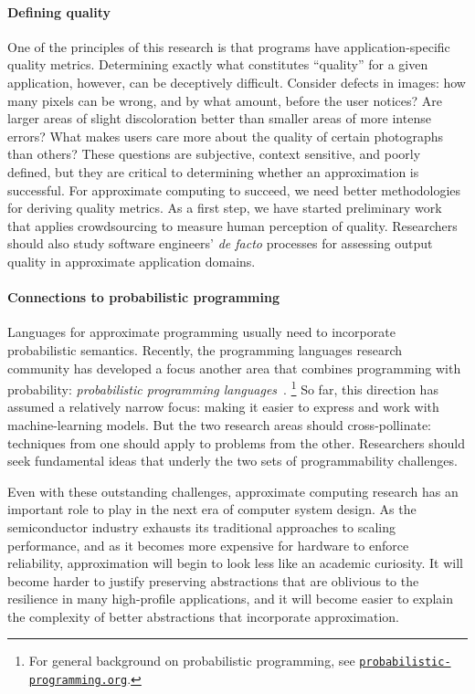 \paragraph{Defining quality}
One of the principles of this research is that programs have
application-specific quality metrics.
Determining exactly what constitutes ``quality'' for a given application,
however, can be deceptively difficult.
Consider defects in images:
how many pixels can be wrong, and by what amount, before the user notices?
Are larger areas of slight discoloration better than smaller areas of more
intense errors?
What makes users care more about the quality of certain photographs than
others?
These questions are subjective, context sensitive, and poorly defined, but
they are critical to determining whether an approximation is successful.
For approximate computing to succeed, we need better methodologies for
deriving quality metrics.
As a first step, we have started preliminary work that applies
crowdsourcing to measure human perception of quality.
Researchers should also study software engineers' \emph{de facto} processes for
assessing output quality in approximate application domains.

\paragraph{Connections to probabilistic programming}
Languages for app\-roximate program\-ming usually need to incorporate probabilistic
semantics.
Recently, the programming languages research community has developed a focus
another area that combines programming with probability:
\emph{probabilistic programming languages}~\cite{BBGR13, wingate-lightweight,
  church, chaganty, pfeffersample, probdsl, koller}.%
\footnote{%
    For general background on probabilistic programming, see
    \href{http://probabilistic-programming.org/}{\texttt{probabilistic-programming.org}}.%
}
So far, this direction has assumed a relatively narrow focus:
making it easier to express and work with machine-learning models.
But the two research areas should cross-pollinate:
techniques from one should apply to problems from the other.
Researchers should seek fundamental ideas that underly the two sets of
programmability challenges.

\vspace{\baselineskip}
\noindent
Even with these outstanding challenges, approximate computing research
has an important role to play in the next era of computer system design.
As the semiconductor industry exhausts its traditional approaches to scaling
performance, and as it becomes more expensive for hardware to enforce
reliability,
approximation will begin to look less like an academic curiosity.
It will become harder to justify preserving abstractions that are oblivious to
the resilience in many high-profile applications,
and it will become easier to explain the complexity of better
abstractions that incorporate approximation.
